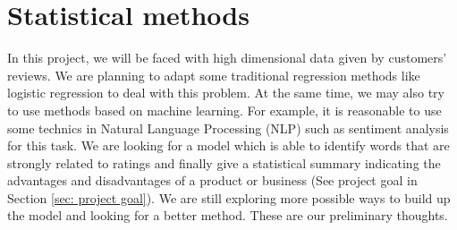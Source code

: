 \documentclass[12pt]{article}
\begin{document}
\section{Statistical methods}
In this project, we will be faced with high dimensional data given by customers' reviews. We are planning to adapt some traditional regression methods like logistic regression to deal with this problem. At the same time, we may also try to use methods based on machine learning. For example, it is reasonable to use some technics in Natural Language Processing (NLP) such as sentiment analysis for this task. We are looking for a model which is able to identify words that are strongly related to ratings and finally give a statistical summary indicating the advantages and disadvantages of a product or business (See project goal in Section \ref{sec: project goal}). We are still exploring more possible ways to build up the model and looking for a better method. These are our preliminary thoughts.

%
%
\end{document}
